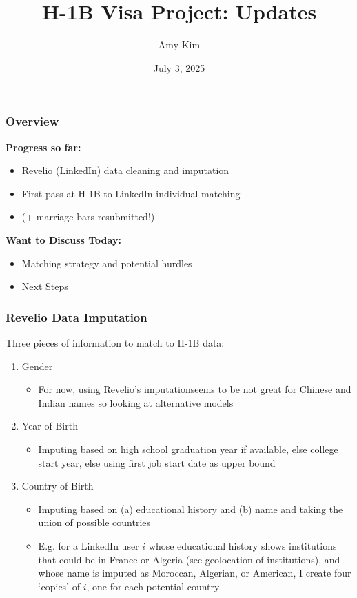 \documentclass[xcolor=dvipsnames, compress, 12pt, aspectratio=169, handout]{beamer}
\title{H-1B Visa Project: Updates}
\author{Amy Kim}
\date{July 3, 2025}
\begin{document}
\begin{frame}
    \frametitle{Overview}
    \textbf{Progress so far:}
    \begin{itemize}
        \item Revelio (LinkedIn) data cleaning and imputation
        \item First pass at H-1B to LinkedIn individual matching 
        \item (+ marriage bars resubmitted!)
    \end{itemize}    
    \vspace{2mm}
    \textbf{Want to Discuss Today:}
    \begin{itemize}
        \item Matching strategy and potential hurdles
        \item Next Steps
    \end{itemize}
\end{frame}

\begin{frame}
    \frametitle{Revelio Data Imputation}
    Three pieces of information to match to H-1B data:
    \begin{enumerate}
        \item Gender 
        \begin{itemize}
            \item For now, using Revelio's imputation\textemdash seems to be not great for Chinese and Indian names so looking at alternative models 
        \end{itemize}
        \item Year of Birth
        \begin{itemize}
            \item Imputing based on high school graduation year if available, else college start year, else using first job start date as upper bound
        \end{itemize}
        \item Country of Birth
        \begin{itemize}
            \item Imputing based on (a) educational history and (b) name and taking the union of possible countries
            \item E.g. for a LinkedIn user $i$ whose educational history shows institutions that could be in France or Algeria (see geolocation of institutions), and whose name is imputed as Moroccan, Algerian, or American, I create four `copies' of $i$, one for each potential country 
        \end{itemize}
    \end{enumerate}
\end{frame}
\end{document}
